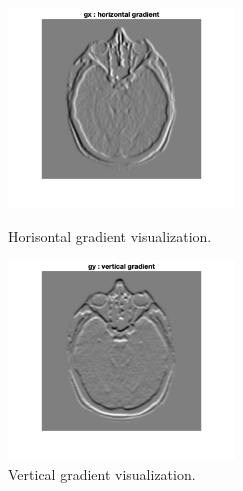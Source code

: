 \documentclass[a4paper,11pt]{article}
\begin{document}
\begin{figure}[ht!]
    \begin{minipage}{0.5\textwidth}
        \centering
        \includegraphics[width=60mm]{gx.png}
        \caption{Horisontal gradient visualization.}
    \end{minipage}\hfill
    \begin{minipage}{0.5\textwidth}
        \centering
        \includegraphics[width=60mm]{gy.png}
        \caption{Vertical gradient visualization.}
    \end{minipage}\hfill
\end{figure}
\noindent
\end{document}
